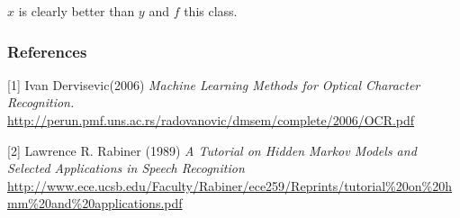 \documentclass{article} %
\begin{document}
$x$ is clearly better than $y$ and $f$ this class.

\subsubsection*{References}

\small{
[1] Ivan Dervisevic(2006) {\it Machine Learning Methods for Optical Character Recognition.} \url{http://perun.pmf.uns.ac.rs/radovanovic/dmsem/complete/2006/OCR.pdf}

[2] Lawrence R. Rabiner (1989) {\it A Tutorial on Hidden Markov Models and Selected Applications in Speech Recognition} \url{http://www.ece.ucsb.edu/Faculty/Rabiner/ece259/Reprints/tutorial\%20on\%20hmm\%20and\%20applications.pdf}
}
\end{document}
